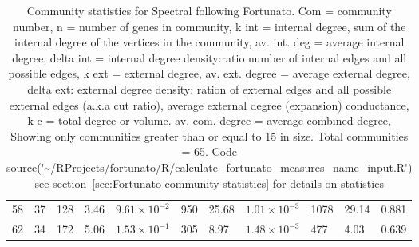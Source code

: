 \begin{table}[ht]
\begin{adjustbox}{width=\textwidth}
\begin{tabular}{lllllllllll}
  58 & 37 & 128 & 3.46 & $9.61 \times 10^{-2}$ & 950 & 25.68 & $1.01 \times 10^{-3}$ & 1078 & 29.14 & 0.881 \\ 
  62 & 34 & 172 & 5.06 & $1.53 \times 10^{-1}$ & 305 & 8.97 & $1.48 \times 10^{-3}$ & 477 & 4.03 & 0.639 \\ 
   \hline
\end{tabular}
\end{adjustbox}
\caption[Community statistics (Fortunato) for Spectral Clustering PSP]{Community statistics for Spectral following Fortunato. Com = community number, n = number of genes in community,
                  k int = internal degree, sum of the internal degree of the vertices in the community,
                  av. int. deg = average internal degree, 
                  delta int = internal degree density:ratio number of internal edges and all possible edges,
                  k ext = external degree, av. ext. degree = average external degree,
                  delta ext: external degree density: ration of external edges and all possible external edges (a.k.a cut ratio),
                  average external degree (expansion) conductance, k c = total degree or volume. av. com. degree = average combined degree, Showing only communities greater than or equal to 15 in size. Total communities = 65. Code \url{source('~/RProjects/fortunato/R/calculate_fortunato_measures_name_input.R')} see section~\ref{sec:Fortunato community statistics} for details on statistics} 
\label{tab:Community statistics for Spectral following Fortunato.}
\end{table}

